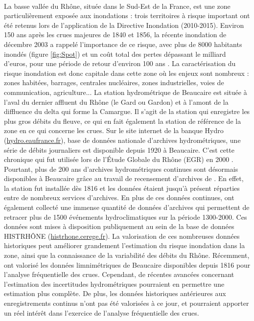 	\paragraph{} La basse vallée du Rhône, située dans le Sud-Est de la France, est une zone particulièrement exposée aux inondations : trois territoires à risque important ont été retenus lors de l'application de la Directive Inondation (2010-2015). Environ 150 ans après les crues majeures de 1840 et 1856, la récente inondation de décembre 2003 a rappelé l'importance de ce risque, avec plus de 8000 habitants inondés (figure \ref{fig:Spot}) et un coût total des pertes dépassant le milliard d'euros, pour une période de retour d'environ 100 ans \citep{medd_debit_2005}. La caractérisation du risque inondation est donc capitale dans cette zone où les enjeux sont nombreux : zones habitées, barrages, centrales nucléaires, zones industrielles, voies de communication, agriculture... La station hydrométrique de Beaucaire est située à l'aval du dernier affluent du Rhône (le Gard ou Gardon) et à l'amont de la diffluence du delta qui forme la Camargue. Il s'agit de la station qui enregistre les plus gros débits du fleuve, ce qui en fait également la station de référence de la zone en ce qui concerne les crues. Sur le site internet de la banque Hydro (\url{hydro.eaufrance.fr}), base de données nationale d'archives hydrométriques, une série de débits journaliers est disponible depuis 1920 à Beaucaire. C'est cette chronique qui fut utilisée lors de l'Étude Globale du Rhône (EGR) en 2000 \citep{rigaudiere_etude_2000}. Pourtant, plus de 200 ans d'archives hydrométriques continues sont désormais disponibles à Beaucaire grâce au travail de recensement d'archives de \citet{pichard_sept_2014}. En effet, la station fut installée dès 1816 et les données étaient jusqu'à présent réparties entre de nombreux services d'archives. En plus de ces données continues, \citet{pichard_sept_2014} ont également collecté une immense quantité de données d'archives qui permettent de retracer plus de 1500 événements hydroclimatiques sur la période 1300-2000. Ces données sont mises à disposition publiquement au sein de la base de données HISTRHÔNE (\url{histrhone.cerege.fr}). La valorisation de ces nombreuses données historiques peut améliorer grandement l'estimation du risque inondation dans la zone, ainsi que la connaissance de la variabilité des débits du Rhône. Récemment, \citet{bard_actualisation_2018} ont valorisé les données limnimétriques de Beaucaire disponibles depuis 1816 pour l'analyse fréquentielle des crues. Cependant, de récentes avancées concernant l'estimation des incertitudes hydrométriques pourraient en permettre une estimation plus complète. De plus, les données historiques antérieures aux enregistrements continus n'ont pas été valorisées à ce jour, et pourraient apporter un réel intérêt dans l'exercice de l'analyse fréquentielle des crues. 
	
